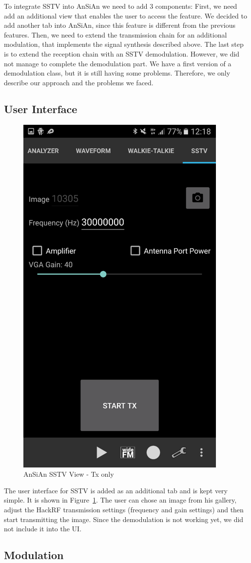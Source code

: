 To integrate \ac{SSTV} into \ac{AnSiAn} we need to add 3 components: First, we need add an additional view that enables the user to access the feature. We decided to add another tab into AnSiAn, since this feature is different from the previous features. Then, we need to extend the transmission chain for an additional modulation, that implements the signal synthesis described above. The last step is to extend the reception chain with an SSTV demodulation. However, we did not manage to complete the demodulation part. We have a first version of a demodulation class, but it is still having some problems. Therefore, we only describe our approach and the problems we faced. 


\subsection{User Interface}
\label{subsec:impl:sstv:ui}

\begin{figure}
	\centering
	\includegraphics[width=0.4\linewidth]{gfx/screenshot_gui_sstv.png}
	\caption{AnSiAn \ac{SSTV} View - Tx only}
	\label{fig:impl:sstv:gui}
\end{figure}

The user interface for SSTV is added as an additional tab and is kept very simple. It is shown in Figure~\ref{fig:impl:sstv:gui}. The user can chose an image from his gallery, adjust the HackRF transmission settings (frequency and gain settings) and then start transmitting the image. Since the demodulation is not working yet, we did not include it into the UI. 

\subsection{Modulation}
\label{subsubsec:impl:sstv:mod}

